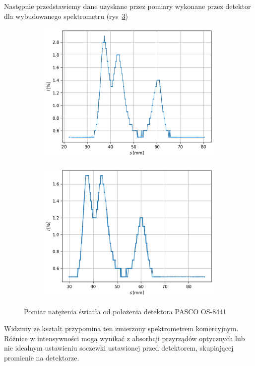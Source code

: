 \documentclass[12pt]{article}
\begin{document}
Następnie przedstawiemy dane uzyskane przez pomiary wykonane przez detektor dla wybudowanego spektrometru (rys~\ref{fig:detektor})
\begin{figure}[H]
	\centering
	\begin{subfigure}{0.45\textwidth}
		\centering
		\includegraphics[width=\linewidth]{detektor0}
		\label{fig:detektor_1}
	\end{subfigure}
	\hfill
	\begin{subfigure}{0.45\textwidth}
		\centering
		\includegraphics[width=\linewidth]{detektor1}
		\label{fig:detektor_2}
	\end{subfigure}
	\caption{Pomiar natężenia światła od położenia detektora PASCO OS-8441}
	\label{fig:detektor}
\end{figure}
Widzimy że kształt przypomina ten zmierzony spektrometrem komercyjnym. Różnice w intensywności mogą wynikać z absorbcji przyrządów optycznych lub nie idealnym ustawieniu soczewki ustawionej przed detektorem, skupiającej promienie na detektorze.
\end{document}
